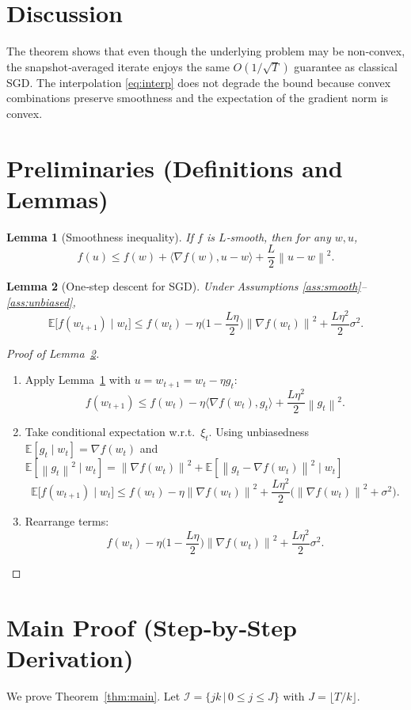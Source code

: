 \documentclass{article}
\newtheorem{lemma}{Lemma}
\newcommand{\E}{\mathbb{E}}
\newcommand{\norm}[1]{\left\lVert#1\right\rVert}
\begin{document}
\section*{Discussion}
The theorem shows that even though the underlying problem may be non‑convex, the snapshot‑averaged iterate enjoys the same $O(1/\sqrt{T})$ guarantee as classical SGD. The interpolation \eqref{eq:interp} does not degrade the bound because convex combinations preserve smoothness and the expectation of the gradient norm is convex.

\section*{Preliminaries (Definitions and Lemmas)}
\begin{lemma}[Smoothness inequality]
\label{lem:smooth}
If $f$ is $L$‑smooth, then for any $w,u$,
\[
f(u)\le f(w)+\langle \nabla f(w),u-w\rangle+\frac{L}{2}\norm{u-w}^2 .
\]
\end{lemma}
\begin{lemma}[One‑step descent for SGD]
\label{lem:onestep}
Under Assumptions \ref{ass:smooth}–\ref{ass:unbiased},
\[
\E\big[f(w_{t+1})\mid w_t\big]\le
f(w_t)-\eta\Big(1-\frac{L\eta}{2}\Big)\norm{\nabla f(w_t)}^2+\frac{L\eta^2}{2}\sigma^2 .
\]
\end{lemma}
\begin{proof}[Proof of Lemma~\ref{lem:onestep}]
\begin{enumerate}
\item[Step 1.] Apply Lemma~\ref{lem:smooth} with $u=w_{t+1}=w_t-\eta g_t$:
\[
f(w_{t+1})\le f(w_t)-\eta\langle \nabla f(w_t),g_t\rangle+\frac{L\eta^2}{2}\norm{g_t}^2 .
\]
\item[Step 2.] Take conditional expectation w.r.t.\ $\xi_t$.
Using unbiasedness $\E[g_t\mid w_t]=\nabla f(w_t)$ and 
$\E[\norm{g_t}^2\mid w_t]=\norm{\nabla f(w_t)}^2+\E[\norm{g_t-\nabla f(w_t)}^2\mid w_t]$
\[
\E\big[f(w_{t+1})\mid w_t\big]\le 
f(w_t)-\eta\norm{\nabla f(w_t)}^2+\frac{L\eta^2}{2}\Big(\norm{\nabla f(w_t)}^2+\sigma^2\Big).
\]
\item[Step 3.] Rearrange terms:
\[
f(w_t)-\eta\Big(1-\frac{L\eta}{2}\Big)\norm{\nabla f(w_t)}^2+\frac{L\eta^2}{2}\sigma^2 .
\]
\end{enumerate}
\end{proof}

\section*{Main Proof (Step‑by‑Step Derivation)}
We prove Theorem~\ref{thm:main}. Let $\mathcal{I}=\{jk\,|\,0\le j\le J\}$ with $J=\lfloor T/k\rfloor$.
\end{document}
